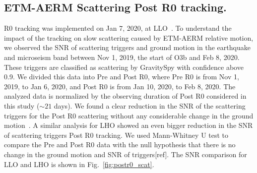 \documentclass[12pt]{iopart}
\begin{document}
\subsection{ETM-AERM Scattering Post R0 tracking.}
R0 tracking was implemented on Jan 7, 2020, at LLO~\cite{alog_anamaria}. To understand the impact of the tracking on slow scattering caused by ETM-AERM relative motion, we observed the SNR of scattering triggers and ground motion in the earthquake and microseism band between Nov 1, 2019, the start of O3b and Feb 8, 2020. These triggers are classified as scattering by GravitySpy with confidence above 0.9. We divided this data into Pre and Post R0, where Pre R0 is from Nov 1, 2019, to Jan 6, 2020, and Post R0 is from Jan 10, 2020, to Feb 8, 2020. The analyzed data is normalized by the observing duration of Post R0 considered in this study ($\sim 21$ days). We found a clear reduction in the SNR of the scattering triggers for the Post R0 scattering without any considerable change in the ground motion~\cite{alogsid_R0}. A similar analysis for LHO showed an even bigger reduction in the SNR of scattering triggers Post R0 tracking. We used Mann-Whitney U test to compare the Pre and Post R0 data with the null hypothesis that there is no change in the ground motion and SNR of triggers[ref]. The SNR comparison for LLO and LHO is shown in Fig.~\ref{fig:postr0_scat}.
\par
\end{document}
